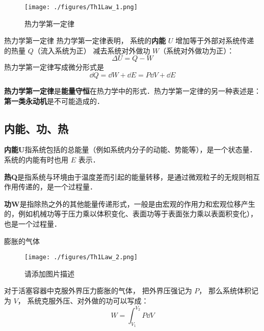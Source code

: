 
\begin{issues}
\issueDraft
\end{issues}

\begin{figure}[ht]
\centering
\texttt{[image: ./figures/Th1Law\_1.png]}
\caption{热力学第一定律} \label{Th1Law_fig1}
\end{figure}

\begin{theorem}{热力学第一定律}
热力学第一定律表明， 系统的\textbf{内能} $U$ 增加等于外部对系统传递的热量 $Q$（流入系统为正） 减去系统对外做功 $W$（系统对外做功为正）：
\begin{equation}\label{Th1Law_eq1}
\Delta U = Q - W
\end{equation}
热力学第一定律写成微分形式是
\begin{equation}\label{Th1Law_eq2}
\dd Q = \dd W + \dd E = P\dd V + \dd E
\end{equation}
\end{theorem}

\textbf{热力学第一定律}是\textbf{能量守恒}在热力学中的形式．热力学第一定律的另一种表述是：\textbf{第一类永动机}是不可能造成的．

\subsection{内能、功、热}
\textbf{内能U}指系统包括的总能量（例如系统内分子的动能、势能等），是一个状态量．系统的内能有时也用 $E$ 表示． 

\textbf{热Q}是指系统与环境由于温度差而引起的能量转移，是通过微观粒子的无规则相互作用传递的，是一个过程量．

\textbf{功W}是指除热之外的其他能量传递形式，一般是由宏观的作用力和宏观位移产生的，例如机械功等于压力乘以体积变化、表面功等于表面张力乘以表面积变化），也是一个过程量．

\begin{example}{膨胀的气体}
\begin{figure}[ht]
\centering
\texttt{[image: ./figures/Th1Law\_2.png]}
\caption{请添加图片描述} \label{Th1Law_fig2}
\end{figure}
对于活塞容器中克服外界压力膨胀的气体， 把外界压强记为 $P$， 那么系统体积记为 $V$， 系统克服外压、对外做的功可以写成：
\begin{equation}
W = \int_{V_1}^{V_2} P \dd{V}
\end{equation}
\end{example}

